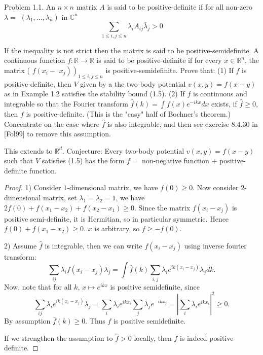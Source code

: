 
\begin{problem}
	Problem 1.1. An $n \times n$ matrix $A$ is said to be positive-definite if for all non-zero $\lambda=$ $\left(\lambda_1, \ldots, \lambda_n\right)$ in $\mathbb{C}^n$
\[
\sum_{1 \leq i, j \leq n} \lambda_i A_{i j} \bar{\lambda}_j>0
\]

If the inequality is not strict then the matrix is said to be positive-semidefinite. A continuous function $f: \mathbb{R} \rightarrow \mathbb{R}$ is said to be positive-definite if for every $x \in \mathbb{R}^n$, the matrix ( $f\left(x_i-\right.$ $\left.\left.x_j\right)\right)_{1 \leq i, j \leq n}$ is positive-semidefinite. Prove that:
(1) If $f$ is positive-definite, then $V$ given by a the two-body potential $v(x, y)=f(x-y)$ as in Example 1.2 satisfies the stability bound (1.5).
(2) If $f$ is continuous and integrable so that the Fourier transform $\hat{f}(k)=\int f(x) e^{-i k x} d x$ exists, if $\hat{f} \geq 0$, then $f$ is positive-definite. (This is the "easy" half of Bochner's theorem.) Concentrate on the case where $\hat{f}$ is also integrable, and then see exercise 8.4.30 in [Fol99] to remove this assumption.

This extends to $\mathbb{R}^d$. Conjecture: Every two-body potential $v(x, y)=f(x-y)$ such that $V$ satisfies (1.5) has the form $f=$ non-negative function + positive-definite function.
\end{problem}
\begin{proof}
	1) Consider  $1$-dimensional matrix, we have $f(0) \ge 0$. Now consider $2$-dimensional matrix, set $\lambda_1 = \lambda_2 = 1$, we have  $2 f(0) + f(x_1 - x_2) + f(x_2 - x_1) \ge 0$. Since the matrix $f(x_i - x_j)$ is positive semi-definite, it is Hermitian, so in particular symmetric. Hence $f(0) + f(x_1 - x_2) \ge 0$. $x$ is arbitrary, so $f \ge  - f\left( 0 \right) $.

	2) Assume $\hat{f} $ is integrable, then we can write $f(x_i - x_j)$ using inverse fourier transform:
	\[
		\sum_{i j} \lambda_i f(x_i - x_j) \overline{\lambda} _j = \int \hat{f} (k) \sum_{i,j} \lambda_i e^{i k (x_i - x_j)} \overline{\lambda} _j dk
	.\] 
	Now, note that for all $k$, $x \mapsto e^{i k x}$ is positive semidefinite, since
	\[
		\sum_{i j} \lambda_i e^{i k (x_i - x_j)} \overline{\lambda} _j
		= \sum_i \lambda_i e^{i k x_i} \sum_j \overline{\lambda} _j e^{- i k x_j}
		= \left| \sum_{i} \lambda_i e^{i k x_i} \right| ^2 \ge 0
	.\] 
	By assumption $\hat{f} (k) \ge 0$. Thus $f$ is positive semidefinite.

	If we strengthen the assumption to $\hat{f} > 0$ locally, then $f$ is indeed positive definite.
\end{proof}


